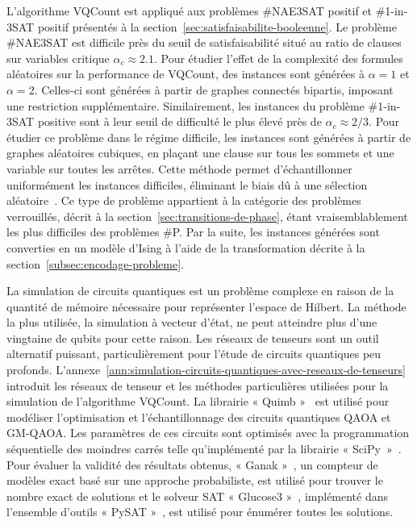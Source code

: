 L'algorithme VQCount est appliqué aux problèmes \#NAE3SAT positif et \#1-in-3SAT positif présentés à la section~\ref{sec:satisfaisabilite-booleenne}. Le problème \#NAE3SAT est difficile près du seuil de satisfaisabilité situé au ratio de clauses sur variables critique $\alpha_{c} \approx 2.1$. Pour étudier l'effet de la complexité des formules aléatoires sur la performance de VQCount, des instances sont générées à $\alpha = 1$ et $\alpha = 2$. Celles-ci sont générées à partir de graphes connectés bipartis, imposant une restriction supplémentaire. Similairement, les instances du problème \#1-in-3SAT positive sont à leur seuil de difficulté le plus élevé près de $\alpha_{c} \approx 2/3$. Pour étudier ce problème dans le régime difficile, les instances sont générées à partir de graphes aléatoires cubiques, en plaçant une clause sur tous les sommets et une variable sur toutes les arrêtes. Cette méthode permet d'échantillonner uniformément les instances difficiles, éliminant le biais dû à une sélection aléatoire~\cite{vigerEfficientSimpleGeneration2005}. Ce type de problème appartient à la catégorie des problèmes verrouillés, décrit à la section~\ref{sec:transitions-de-phase}, étant vraisemblablement les plus difficiles des problèmes \textsf{\#P}. Par la suite, les instances générées sont converties en un modèle d'Ising à l'aide de la transformation décrite à la section~\ref{subsec:encodage-probleme}.

La simulation de circuits quantiques est un problème complexe en raison de la quantité de mémoire nécessaire pour représenter l'espace de Hilbert. La méthode la plus utilisée, la simulation à vecteur d'état, ne peut atteindre plus d'une vingtaine de qubits pour cette raison. Les réseaux de tenseurs sont un outil alternatif puissant, particulièrement pour l'étude de circuits quantiques peu profonds. L'annexe~\ref{ann:simulation-circuits-quantiques-avec-reseaux-de-tenseurs} introduit les réseaux de tenseur et les méthodes particulières utilisées pour la simulation de l'algorithme VQCount. La librairie « Quimb »~\cite{grayQuimbPythonPackage2018} est utilisé pour modéliser l'optimisation et l'échantillonnage des circuits quantiques QAOA et GM-QAOA. Les paramètres de ces circuits sont optimisés avec la programmation séquentielle des moindres carrés telle qu'implémenté par la librairie « SciPy »~\cite{virtanenSciPy10Fundamental2020}. Pour évaluer la validité des résultats obtenus, « Ganak »~\cite{sharmaGANAKScalableProbabilistic2019}, un compteur de modèles exact basé sur une approche probabiliste, est utilisé pour trouver le nombre exact de solutions et le solveur SAT « Glucose3 »~\cite{eenExtensibleSATsolver2004,audemardPredictingLearntClauses2009}, implémenté dans l'ensemble d'outils « PySAT »~\cite{ignatievPySATPythonToolkit2018}, est utilisé pour énumérer toutes les solutions.

